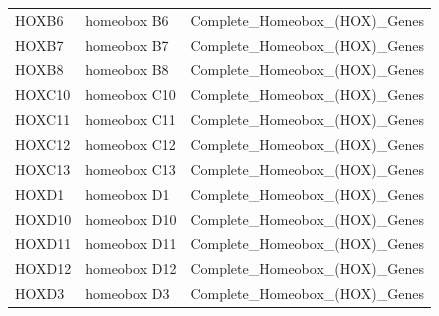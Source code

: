 \documentclass[11pt]{article}
\begin{document}
\begin{table}[H]
{\begin{tabular}{|l|l|l|}
HOXB6   & homeobox B6                                                                                                    & Complete\_Homeobox\_(HOX)\_Genes                         \\
HOXB7   & homeobox B7                                                                                                    & Complete\_Homeobox\_(HOX)\_Genes                         \\
HOXB8   & homeobox B8                                                                                                    & Complete\_Homeobox\_(HOX)\_Genes                         \\
HOXC10  & homeobox C10                                                                                                   & Complete\_Homeobox\_(HOX)\_Genes                         \\
HOXC11  & homeobox C11                                                                                                   & Complete\_Homeobox\_(HOX)\_Genes                         \\
HOXC12  & homeobox C12                                                                                                   & Complete\_Homeobox\_(HOX)\_Genes                         \\
HOXC13  & homeobox C13                                                                                                   & Complete\_Homeobox\_(HOX)\_Genes                         \\
HOXD1   & homeobox D1                                                                                                    & Complete\_Homeobox\_(HOX)\_Genes                         \\
HOXD10  & homeobox D10                                                                                                   & Complete\_Homeobox\_(HOX)\_Genes                         \\
HOXD11  & homeobox D11                                                                                                   & Complete\_Homeobox\_(HOX)\_Genes                         \\
HOXD12  & homeobox D12                                                                                                   & Complete\_Homeobox\_(HOX)\_Genes                         \\
HOXD3   & homeobox D3                                                                                                    & Complete\_Homeobox\_(HOX)\_Genes                         \\

\end{tabular}}
\end{table}
\end{document}
